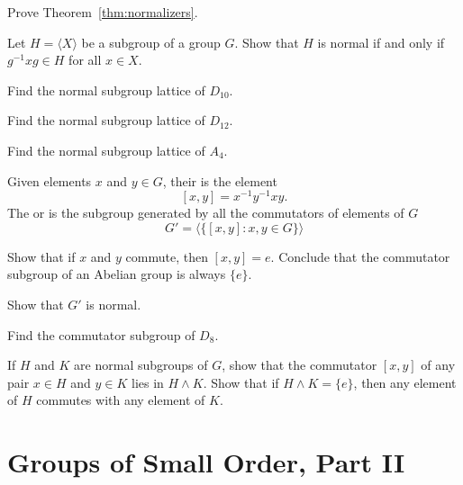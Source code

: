 \begin{exercises}
  \item Prove Theorem~\ref{thm:normalizers}.
  
  \item Let $H = \langle X \rangle$ be a subgroup of a group $G$. 
    Show that $H$ is normal if and only if $g^{-1}xg \in H$ for all $x
    \in X$.
  
  \item Find the normal subgroup lattice of $D_{10}$.

  \item Find the normal subgroup lattice of $D_{12}$.
  
  \item Find the normal subgroup lattice of $A_{4}$.
  
  \item\label{ex:commutatorsubgroup} Given elements $x$ and $y \in G$,
    their  is the element
    \[
      [x,y] = x^{-1}y^{-1}xy.
    \]
    The  or  is the subgroup generated by all 
    the commutators of elements of $G$
    \[
      G' = \langle \{ [x,y] : x, y \in G\} \rangle
    \]
    
    \begin{theoremenum}
      \item Show that if $x$ and $y$ commute, then $[x,y] = e$.  
        Conclude that the commutator subgroup of an Abelian group is 
        always $\{e\}$.
      
      \item Show that $G'$ is normal.
      
      \item Find the commutator subgroup of $D_{8}$.
      
      \item If $H$ and $K$ are normal subgroups of $G$, show that the 
        commutator $[x,y]$ of any pair $x \in H$ and $y \in K$ lies 
        in $H \wedge K$.  Show that if $H \wedge K = \{e\}$, then any 
        element of $H$ commutes with any element of $K$.

    \end{theoremenum}
\end{exercises}

\section{Groups of Small Order, Part II}

